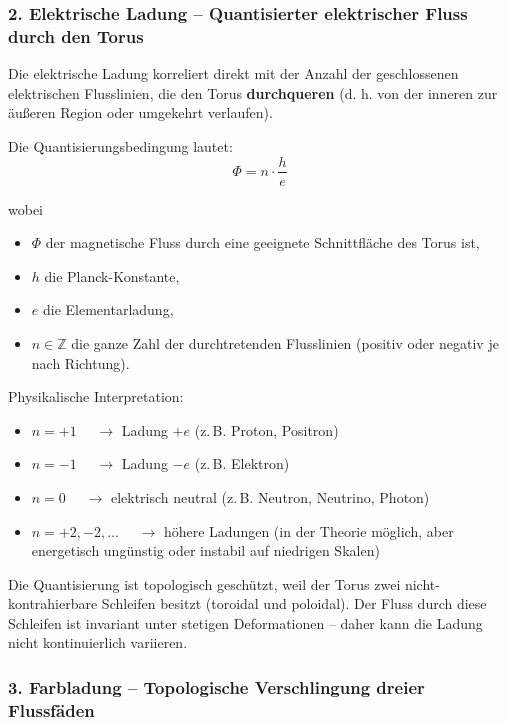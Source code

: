 	\subsubsection{2. Elektrische Ladung – Quantisierter elektrischer Fluss durch den Torus}
	
	Die elektrische Ladung korreliert direkt mit der Anzahl der geschlossenen elektrischen Flusslinien, die den Torus \textbf{durchqueren} (d. h. von der inneren zur äußeren Region oder umgekehrt verlaufen).
	
	Die Quantisierungsbedingung lautet:
	\begin{equation}
		\Phi = n \cdot \frac{h}{e}
		\label{eq:flux_quantization}
	\end{equation}
	
	wobei
	\begin{itemize}
		\item $\Phi$ der magnetische Fluss durch eine geeignete Schnittfläche des Torus ist,
		\item $h$ die Planck-Konstante,
		\item $e$ die Elementarladung,
		\item $n \in \mathbb{Z}$ die ganze Zahl der durchtretenden Flusslinien (positiv oder negativ je nach Richtung).
	\end{itemize}
	
	Physikalische Interpretation:
	\begin{itemize}
		\item $n = +1$ $\quad \to$ Ladung $+e$ \quad (z.\,B. Proton, Positron)
		\item $n = -1$ $\quad \to$ Ladung $-e$ \quad (z.\,B. Elektron)
		\item $n = 0$   $\quad \to$ elektrisch neutral \quad (z.\,B. Neutron, Neutrino, Photon)
		\item $n = +2, -2, \dots$ $\quad \to$ höhere Ladungen (in der Theorie möglich, aber energetisch ungünstig oder instabil auf niedrigen Skalen)
	\end{itemize}
	
	Die Quantisierung ist topologisch geschützt, weil der Torus zwei nicht-kontrahierbare Schleifen besitzt (toroidal und poloidal). Der Fluss durch diese Schleifen ist invariant unter stetigen Deformationen – daher kann die Ladung nicht kontinuierlich variieren.
	
	\subsubsection{3. Farbladung – Topologische Verschlingung dreier Flussfäden}
	
